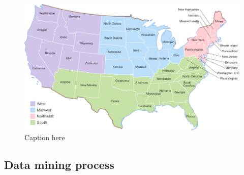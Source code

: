 \begin{figure}[H]
	\centering
	\includegraphics[width=\textwidth]{./images/us-map}
	\caption{Caption here}
	\label{fig:us-map}
\end{figure}


\subsection{Data mining process}


